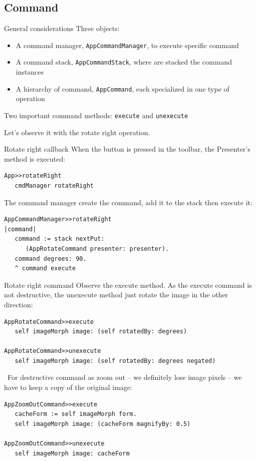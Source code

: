 \documentclass{beamer}
\newcommand{\tip}{\boldmath{\textcolor{red}{$\Rightarrow$}}}
\begin{document}
\subsection{Command}
\begin{frame}{General considerations}
  Three objects:
  \begin{itemize}
  \item A command manager, \texttt{AppCommandManager}, to execute
    specific command
  \item A command stack, \texttt{AppCommandStack}, where are stacked the command instances
  \item A hierarchy of command, \texttt{AppCommand}, each specialized
    in one type of operation
  \end{itemize}

  Two important command methods: \texttt{execute} and
  \texttt{unexecute}

  Let's observe it with the rotate right operation.
\end{frame}

\begin{frame}[fragile]{Rotate right callback}
  When the button is pressed in the toolbar, the Presenter's method is
  executed:
\fontsize{10pt}{8pt}\selectfont

 \begin{lstlisting}[language=Smalltalk]
App>>rotateRight
   cmdManager rotateRight 
 \end{lstlisting}
 The command manager create the command, add it to the stack then
 execute it:
 \begin{lstlisting}[language=Smalltalk]
AppCommandManager>>rotateRight
|command|
   command := stack nextPut:
      (AppRotateCommand presenter: presenter).
   command degrees: 90.
   ^ command execute
 \end{lstlisting}
\end{frame}
%
\begin{frame}[fragile]{Rotate right command}
  Observe the execute method. As the execute command is not
  destructive, the unexecute method just rotate the image in the other
  direction:

  \fontsize{10pt}{8pt}\selectfont

 \begin{lstlisting}[language=Smalltalk]
AppRotateCommand>>execute
   self imageMorph image: (self rotatedBy: degrees)

AppRotateCommand>>unexecute
   self imageMorph image: (self rotatedBy: degrees negated)   
 \end{lstlisting}
 
  \fontsize{11pt}{8pt}\selectfont
\tip\  For destructive command as zoom out -- we definitely lose image
 pixels -- we have to keep a copy of the original image:
  \fontsize{10pt}{8pt}\selectfont
  \begin{lstlisting}[language=Smalltalk]
AppZoomOutCommand>>execute
   cacheForm := self imageMorph form.
   self imageMorph image: (cacheForm magnifyBy: 0.5)

AppZoomOutCommand>>unexecute
   self imageMorph image: cacheForm   
\end{lstlisting}

\end{frame}
\end{document}
